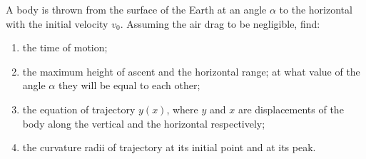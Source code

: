 
\item A body is thrown from the surface of the Earth at an angle $\alpha$ to the horizontal with the initial velocity $v_0$. Assuming the air drag to be negligible, find:
    \begin{enumerate}
        \item the time of motion;
        \item the maximum height of ascent and the horizontal range; at what value of the angle $\alpha$ they will be equal to each other;
        \item the equation of trajectory $y(x)$, where $y$ and $x$ are displacements of the body along the vertical and the horizontal respectively;
        \item the curvature radii of trajectory at its initial point and at its peak.
    \end{enumerate}

